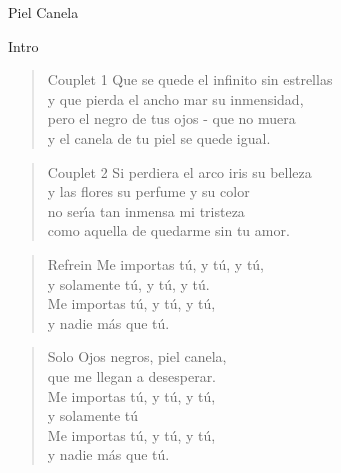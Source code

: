 \begin{song}[son]{Piel Canela}

\begin{instrumental}{Intro}
      
\end{instrumental}

\begin{verse}{Couplet 1}
  Que se quede el infinito sin estrellas\hspace{3em}\\
  y que pierda el ancho mar su inmensidad,\\
  pero el negro de tus ojos - que no muera\\
  y el canela de tu piel se quede igual.
\end{verse}

\begin{verse}{Couplet 2}
  Si perdiera el arco iris su belleza\hspace{3em}\\
  y las flores su perfume y su color \\
  no ser\'{\i}a tan inmensa mi tristeza \\
  como aquella de quedarme sin tu amor.
\end{verse}

\begin{verse}{Refrein}
  Me importas t\'{u}, y t\'{u}, y t\'{u},  \\
  y solamente t\'{u}, y t\'{u}, y t\'{u}.  \\
  Me importas t\'{u}, y t\'{u}, y t\'{u},  \\
  y nadie m\'{a}s que t\'{u}.
\end{verse}

\begin{verse}{Solo}
  Ojos negros, piel canela,  \\
  que me llegan a desesperar.  \\
  Me importas t\'{u}, y t\'{u}, y t\'{u},  \\
  y solamente t\'{u}\hspace{2em}\hspace{2em}\\
  Me importas t\'{u}, y t\'{u}, y t\'{u},\\
  y nadie m\'{a}s que t\'{u}.
\end{verse}

\end{song}

